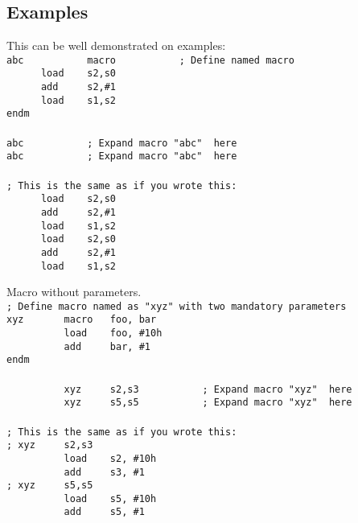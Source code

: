     \subsection{Examples}
        This can be well demonstrated on examples:\\
        {
            \usecodefont
            \verb'abc           macro           ; Define named macro '\\
            \verb'      load    s2,s0'\\
            \verb'      add     s2,#1'\\
            \verb'      load    s1,s2'\\
            \verb'endm'\\\\
            \verb'abc           ; Expand macro "abc"  here'\\
            \verb'abc           ; Expand macro "abc"  here'\\\\
            \verb'; This is the same as if you wrote this:'\\
            \verb'      load    s2,s0'\\
            \verb'      add     s2,#1'\\
            \verb'      load    s1,s2'\\
            \verb'      load    s2,s0'\\
            \verb'      add     s2,#1'\\
            \verb'      load    s1,s2'\\
        }

        Macro without parameters.\\
        {
            \usecodefont
            \verb'; Define macro named as "xyz" with two mandatory parameters'\\
            \verb'xyz       macro   foo, bar'\\
            \verb'          load    foo, #10h'\\
            \verb'          add     bar, #1'\\
            \verb'endm'\\\\
            \verb'          xyz     s2,s3           ; Expand macro "xyz"  here'\\
            \verb'          xyz     s5,s5           ; Expand macro "xyz"  here'\\\\
            \verb'; This is the same as if you wrote this:'\\
            \verb'; xyz     s2,s3'\\
            \verb'          load    s2, #10h'\\
            \verb'          add     s3, #1'\\
            \verb'; xyz     s5,s5'\\
            \verb'          load    s5, #10h'\\
            \verb'          add     s5, #1'\\
        }

